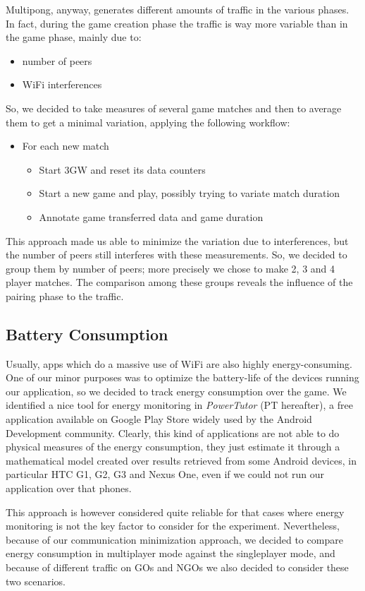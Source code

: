 Multipong, anyway, generates different amounts of traffic in the various phases. In fact, during the game creation phase the traffic is way more variable than in the game phase, mainly due to:

\begin{itemize}
\item number of peers
\item WiFi interferences
\end{itemize}

So, we decided to take measures of several game matches and then to average them to get a minimal variation, applying the following workflow:

\begin{itemize}
\item For each new match
	\begin{itemize}
	\item Start 3GW and reset its data counters
	\item Start a new game and play, possibly trying to variate match duration
	\item Annotate game transferred data and game duration
	\end{itemize}
\end{itemize}

This approach made us able to minimize the variation due to interferences, but the number of peers still interferes with these measurements. So, we decided to group them by number of peers; more precisely we chose to make 2, 3 and 4 player matches. The comparison among these groups reveals the influence of the pairing phase to the traffic.

\subsection{Battery Consumption}

Usually, apps which do a massive use of WiFi are also highly energy-consuming. One of our minor purposes was to optimize the battery-life of the devices running our application, so we decided to track energy consumption over the game. We identified a nice tool for energy monitoring in \textit{PowerTutor} (PT hereafter), a free application available on Google Play Store widely used by the Android Development community. Clearly, this kind of applications are not able to do physical measures of the energy consumption, they just estimate it through a mathematical model created over results retrieved from some Android devices, in particular HTC G1, G2, G3 and Nexus One, even if we could not run our application over that phones. 

This approach is however considered quite reliable for that cases where energy monitoring is not the key factor to consider for the experiment. Nevertheless, because of our communication minimization approach, we decided to compare energy consumption in multiplayer mode against the singleplayer mode, and because of different traffic on GOs and NGOs we also decided to consider these two scenarios.
